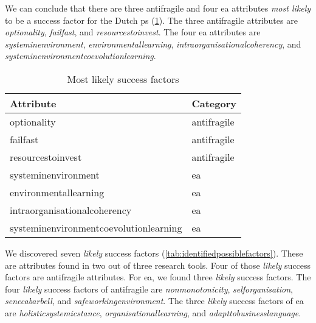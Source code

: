 We can conclude that there are three \gls{antifragile} and four \acrlong{ea} \glspl{attribute} \textit{most likely} to be a success factor for the Dutch \gls{ps} (\cref{tab:identifiedsuccessfactors}). The three \gls{antifragile} \glspl{attribute} are \textit{\gls{optionality}}, \textit{\gls{failfast}}, and \textit{\gls{resourcestoinvest}}. The four \acrlong{ea} \glspl{attribute} are \textit{\gls{systeminenvironment}}, \textit{\gls{environmentallearning}}, \textit{\gls{intraorganisationalcoherency}}, and \textit{\gls{systeminenvironmentcoevolutionlearning}}.

\begin{table}[H]
	\centering
	\begin{tabular}{@{}ll@{}}
		\toprule
	\textbf{Attribute} & \textbf{Category} \\%
		\midrule
		\Gls{optionality} & \Gls{antifragile} \\%
		\Gls{failfast} & \Gls{antifragile} \\%
		\Gls{resourcestoinvest} & \Gls{antifragile} \\%
		\Gls{systeminenvironment} & \acrlong{ea} \\%
		\Gls{environmentallearning} & \acrlong{ea} \\%
		\Gls{intraorganisationalcoherency} & \acrlong{ea} \\%
		\Gls{systeminenvironmentcoevolutionlearning} & \acrlong{ea} \\%
		\bottomrule
	\end{tabular}%
	\caption[Most likely success factors]{Most likely success factors}
	\label{tab:identifiedsuccessfactors}%
\end{table}%
We discovered seven \textit{likely} success factors (\cref{tab:identifiedpossiblefactors}). These are \glspl{attribute} found in two out of three research tools. Four of those \textit{likely} success factors are \gls{antifragile} \glspl{attribute}. For \acrlong{ea}, we found three \textit{likely} success factors. The four \textit{likely} success factors of \gls{antifragile} are \textit{\gls{nonmonotonicity}}, \textit{\gls{selforganisation}}, \textit{\gls{senecabarbell}}, and \textit{\gls{safeworkingenvironment}}. The three \textit{likely} success factors of \acrlong{ea} are \textit{\gls{holisticsystemicstance}}, \textit{\gls{organisationallearning}}, and \textit{\gls{adapttobusinesslanguage}}.
